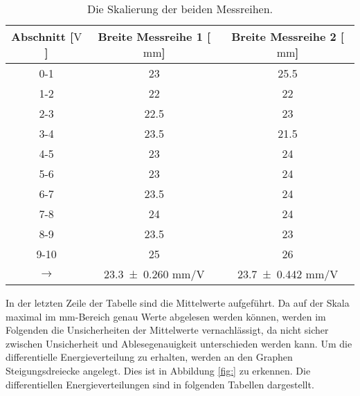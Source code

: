 \begin{table}[H]
  \centering
  \caption{Die Skalierung der beiden Messreihen.}
  \label{tab:skalierungausw}
    \begin{tabular}{S S S}
      \toprule
      {Abschnitt [$\si{\volt}$]} & {Breite Messreihe 1 [$\si{\milli\meter}$]} & {Breite Messreihe 2 [$\si{\milli\meter}$]} \\
      \midrule
      {0-1}  &  23   & 25.5  \\
      {1-2}  &  22   & 22  \\
      {2-3}  &  22.5 & 23  \\
      {3-4}  &  23.5 & 21.5  \\
      {4-5}  &  23   & 24  \\
      {5-6}  &  23   & 24  \\
      {6-7}  &  23.5 & 24  \\
      {7-8}  &  24   & 24  \\
      {8-9}  &  23.5 & 23  \\
      {9-10} &  25   & 26  \\
      {$\rightarrow$} & \num{23.3 \pm 0.260} mm/V  & \num{23.7 \pm 0.442} mm/V \\
      \bottomrule
    \end{tabular}
  \end{table}
\noindent
In der letzten Zeile der Tabelle sind die Mittelwerte aufgeführt. Da auf der Skala maximal im
$\si{\milli\meter}$-Bereich genau Werte abgelesen
werden können, werden im Folgenden die Unsicherheiten der Mittelwerte vernachlässigt, da nicht sicher
zwischen Unsicherheit und Ablesegenauigkeit unterschieden werden kann.
Um die differentielle Energieverteilung zu erhalten, werden an den Graphen
Steigungsdreiecke angelegt. Dies ist in Abbildung \ref{fig:} zu erkennen.
Die differentiellen Energieverteilungen sind in folgenden Tabellen dargestellt.


